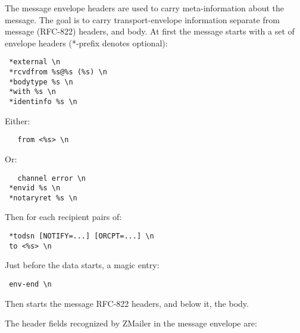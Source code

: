 The message envelope headers are used to carry meta-information
about the message.  The goal is to carry transport-envelope 
information separate from message (RFC-822) headers, and body.
At first the message starts with a set of envelope headers 
(*-prefix denotes optional):

\begin{tscreen}
\begin{verbatim}
 *external \n
 *rcvdfrom %s@%s (%s) \n
 *bodytype %s \n
 *with %s \n
 *identinfo %s \n
\end{verbatim}
\end{tscreen}

Either:
\begin{tscreen}
\begin{verbatim}
   from <%s> \n
\end{verbatim}
\end{tscreen}

Or:
\begin{tscreen}
\begin{verbatim}
   channel error \n
 *envid %s \n
 *notaryret %s \n
\end{verbatim}
\end{tscreen}


Then for each recipient pairs of:
\begin{tscreen}
\begin{verbatim}
 *todsn [NOTIFY=...] [ORCPT=...] \n
 to <%s> \n
\end{verbatim}
\end{tscreen}


Just before the data starts, a magic entry:
\begin{tscreen}
\begin{verbatim}
 env-end \n
\end{verbatim}
\end{tscreen}


Then starts the message RFC-822 headers, and below it, the body.

The header fields recognized by ZMailer in the message envelope are:

